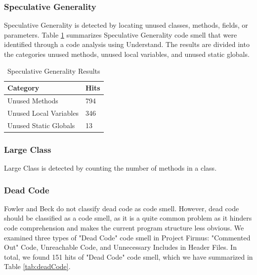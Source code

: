 \subsubsection{Speculative Generality}
Speculative Generality is detected by locating unused classes, methods, fields, or parameters. Table \ref{tab:speculativeGenerality} summarizes Speculative Generality code smell that were identified through a code analysis using Understand. The results are divided into the categories unused methods, unused local variables, and unused static globals. 

\begin{table}[]
\centering
\caption{Speculative Generality Results}
\label{tab:speculativeGenerality}
\begin{tabular}{|l|l|}
\hline
\textbf{Category}		& 	\textbf{Hits} \\ \hline
Unused Methods 			&	794  \\ \hline
Unused Local Variables 	& 	346	 \\ \hline
Unused Static Globals 	& 	13	 \\ \hline
\end{tabular}
\end{table}




\subsubsection{Large Class}
Large Class is detected by counting the number of methods in a class. 



\subsubsection{Dead Code}
Fowler and Beck\cite{1999:RID:311424} do not classify dead code as code smell. However, dead code should be classified as a code smell, as it is a quite common problem as it hinders code comprehension and makes the current program structure less obvious\cite{mantyla2003taxonomy}. We examined three types of "Dead Code" code smell in Project Firmus: "Commented Out" Code, Unreachable Code, and Unnecessary Includes in Header Files. In total, we found 151 hits of "Dead Code" code smell, which we have summarized in Table \ref{tab:deadCode}.

